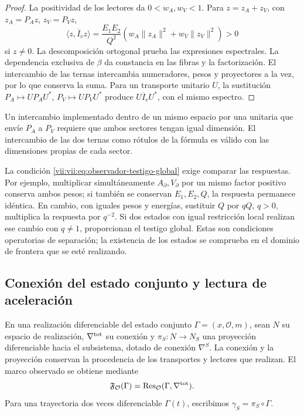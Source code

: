 \begin{proof}
La positividad de los lectores da \(0<w_A,w_V<1\). Para
\(z=z_A+z_V\), con \(z_A=P_Az\), \(z_V=P_Vz\),
\[
 \langle z,\overline I_vz\rangle
 =\frac{E_1E_2}{Q^2}
   (w_A\|z_A\|^2+w_V\|z_V\|^2)>0
\]
si \(z\neq0\). La descomposición ortogonal prueba las expresiones
espectrales. La dependencia exclusiva de \(\beta\) da constancia
en las fibras y la factorización. El intercambio de las ternas
intercambia numeradores, pesos y proyectores a la vez, por lo que
conserva la suma. Para un transporte unitario \(U\), la sustitución
\(P_A\mapsto UP_AU^*\), \(P_V\mapsto UP_VU^*\) produce
\(U\overline I_vU^*\), con el mismo espectro.
\end{proof}

Un intercambio implementado dentro de un mismo espacio por una unitaria
que envíe \(P_A\) a \(P_V\) requiere que ambos sectores tengan
igual dimensión. El intercambio de las dos ternas como rótulos de la
fórmula es válido con las dimensiones propias de cada sector.

La condición \eqref{vii:vii:eq:observador-testigo-global} exige comparar
las respuestas. Por ejemplo, multiplicar simultáneamente
\(A_\partial,V_\partial\) por un mismo factor positivo conserva
ambos pesos; si también se conservan \(E_1,E_2,Q\), la respuesta
permanece idéntica. En cambio, con iguales pesos y energías, sustituir
\(Q\) por \(qQ\), \(q>0\), multiplica la respuesta por \(q^{-2}\).
Si dos estados con igual restricción local realizan ese cambio con
\(q\neq1\), proporcionan el testigo global. Estas son condiciones
operatorias de separación; la existencia de los estados se comprueba
en el dominio de frontera que se esté realizando.

\subsection{Conexión del estado conjunto y lectura de aceleración}
\label{vii:vii:sec:observador-autoinercia}

En una realización diferenciable del estado conjunto
\(\Gamma=(x,\mathcal O,m)\), sean \(N\) su espacio de realización,
\(\nabla^{\rm tot}\) su conexión y \(\pi_S:N\to N_S\) una
proyección diferenciable hacia el subsistema, dotado de conexión
\(\nabla^S\). La conexión y la proyección conservan la procedencia
de los transportes y lectores que realizan. El marco observado se
obtiene mediante
\[
 \mathfrak F_{\mathcal O}(\Gamma)
 =\operatorname{Res}_{\mathcal O}(\Gamma,\nabla^{\rm tot}).
\]
Para una trayectoria dos veces diferenciable \(\Gamma(t)\),
escribimos \(\gamma_S=\pi_S\circ\Gamma\).

